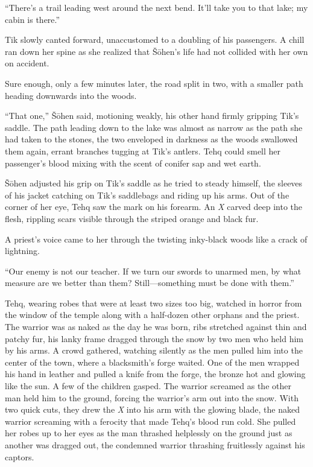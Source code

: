 ``There's a trail leading west around the next bend. It'll take you to that lake; my cabin is there.''

Tik slowly canted forward, unaccustomed to a doubling of his passengers. A chill ran down her spine as she realized that Šōhen's life had not collided with her own on accident.

Sure enough, only a few minutes later, the road split in two, with a smaller path heading downwards into the woods.

``That one,'' Šōhen said, motioning weakly, his other hand firmly gripping Tik's saddle. The path leading down to the lake was almost as narrow as the path she had taken to the stones, the two enveloped in darkness as the woods swallowed them again, errant branches tugging at Tik's antlers. Tehq could smell her passenger's blood mixing with the scent of conifer sap and wet earth.

Šōhen adjusted his grip on Tik's saddle as he tried to steady himself, the sleeves of his jacket catching on Tik's saddlebags and riding up his arms. Out of the corner of her eye, Tehq saw the mark on his forearm. An \emph{X} carved deep into the flesh, rippling scars visible through the striped orange and black fur.

A priest's voice came to her through the twisting inky-black woods like a crack of lightning.

``Our enemy is not our teacher. If we turn our swords to unarmed men, by what measure are we better than them? Still---something must be done with them.''

Tehq, wearing robes that were at least two sizes too big, watched in horror from the window of the temple along with a half-dozen other orphans and the priest. The warrior was as naked as the day he was born, ribs stretched against thin and patchy fur, his lanky frame dragged through the snow by two men who held him by his arms. A crowd gathered, watching silently as the men pulled him into the center of the town, where a blacksmith's forge waited. One of the men wrapped his hand in leather and pulled a knife from the forge, the bronze hot and glowing like the sun. A few of the children gasped. The warrior screamed as the other man held him to the ground, forcing the warrior's arm out into the snow. With two quick cuts, they drew the \emph{X} into his arm with the glowing blade, the naked warrior screaming with a ferocity that made Tehq's blood run cold. She pulled her robes up to her eyes as the man thrashed helplessly on the ground just as another was dragged out, the condemned warrior thrashing fruitlessly against his captors.

